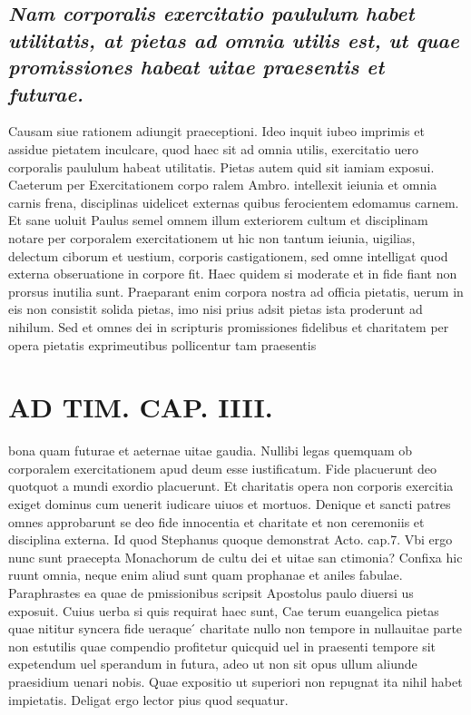 \documentclass{article}
\begin{document}
\begin{pages}
\subsection*{\textit{Nam corporalis exercitatio paululum habet utilitatis, at pietas ad omnia utilis est, ut quae promissiones habeat uitae praesentis et futurae. }}\pstart Causam siue rationem adiungit praeceptioni. Ideo inquit iubeo imprimis et assidue pietatem inculcare, quod haec sit ad omnia utilis, exercitatio uero corporalis paululum habeat utilitatis. Pietas autem quid sit iamiam exposui. Caeterum per Exercitationem corpo ralem Ambro. intellexit ieiunia et omnia carnis frena, disciplinas uidelicet externas quibus ferocientem edomamus carnem. Et sane uoluit Paulus semel omnem illum exteriorem cultum et disciplinam notare per corporalem exercitationem ut hic non tantum ieiunia, uigilias, delectum ciborum et uestium, corporis castigationem, sed omne intelligat quod externa obseruatione in corpore fit. Haec quidem si moderate et in fide fiant non prorsus inutilia sunt. Praeparant enim corpora nostra ad officia pietatis, uerum in eis non consistit solida pietas, imo nisi prius adsit pietas ista proderunt ad nihilum. Sed et omnes dei in scripturis promissiones fidelibus et charitatem per opera pietatis exprimeutibus pollicentur tam praesentis  \pend
\section*{AD TIM. CAP. IIII. }
\marginpar{[ p.143 ]}\pstart bona quam futurae et aeternae uitae gaudia. Nullibi legas quemquam ob corporalem exercitationem apud deum esse iustificatum. Fide placuerunt deo quotquot a mundi exordio placuerunt. Et charitatis opera non corporis exercitia exiget dominus cum uenerit iudicare uiuos et mortuos. Denique et sancti patres omnes approbarunt se deo fide innocentia et charitate et non ceremoniis et disciplina externa. Id quod Stephanus quoque demonstrat Acto. cap.7. Vbi ergo nunc sunt praecepta Monachorum de cultu dei et uitae san ctimonia? Confixa hic ruunt omnia, neque enim aliud sunt quam prophanae et aniles fabulae. Paraphrastes ea quae de pmissionibus scripsit Apostolus paulo diuersi us exposuit. Cuius uerba si quis requirat haec sunt, Cae terum euangelica pietas quae nititur syncera fide ueraque ́ charitate nullo non tempore in nullauitae parte non estutilis quae compendio profitetur quicquid uel in praesenti tempore sit expetendum uel sperandum in futura, adeo ut non sit opus ullum aliunde praesidium uenari nobis. Quae expositio ut superiori non repugnat ita nihil habet impietatis. Deligat ergo lector pius quod sequatur.  \pend
{}
{}

\end{pages}
\end{document}
